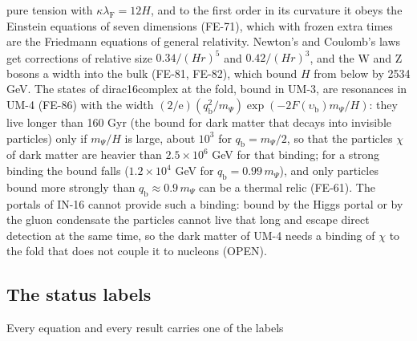 \documentclass[
  10pt,
]{article}
\begin{document}
\begin{itemize}
  pure tension with \(\kappa\lambda_{\mathrm{F}} = 12H\), and to the
  first order in its curvature it obeys the Einstein equations of seven
  dimensions (FE-71), which with frozen extra times are the Friedmann
  equations of general relativity. Newton's and Coulomb's laws get
  corrections of relative size \(0.34/(Hr)^5\) and \(0.42/(Hr)^3\), and
  the W and Z bosons a width into the bulk (FE-81, FE-82), which bound
  \(H\) from below by 2534 GeV. The states of dirac16complex at the
  fold, bound in UM-3, are resonances in UM-4 (FE-86) with the width
  \((2/\mathrm{e})(q_{\mathrm{b}}^2/m_\Psi)\exp(-2F(\upsilon_{\mathrm{b}})m_\Psi/H)\):
  they live longer than 160 Gyr (the bound for dark matter that decays
  into invisible particles) only if \(m_\Psi/H\) is large, about
  \(10^3\) for \(q_{\mathrm{b}} = m_\Psi/2\), so that the particles
  \(\chi\) of dark matter are heavier than \(2.5\times10^6\) GeV for
  that binding; for a strong binding the bound falls (\(1.2\times10^4\)
  GeV for \(q_{\mathrm{b}} = 0.99\,m_\Psi\)), and only particles bound
  more strongly than \(q_{\mathrm{b}} \approx 0.9\,m_\Psi\) can be a
  thermal relic (FE-61). The portals of IN-16 cannot provide such a
  binding: bound by the Higgs portal or by the gluon condensate the
  particles cannot live that long and escape direct detection at the
  same time, so the dark matter of UM-4 needs a binding of \(\chi\) to
  the fold that does not couple it to nucleons (OPEN).
\end{itemize}

\hypertarget{the-status-labels}{%
\subsection{The status labels}\label{the-status-labels}}

Every equation and every result carries one of the labels
\end{document}
